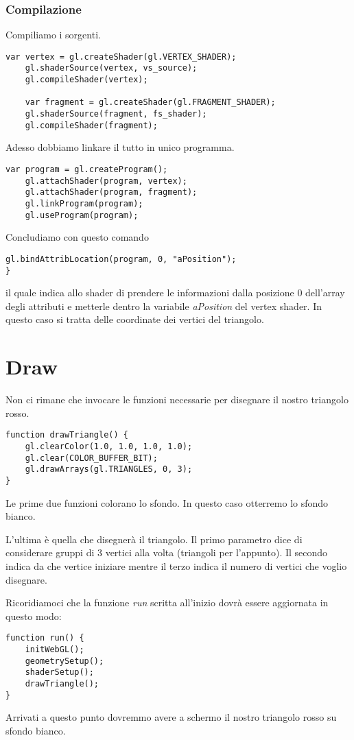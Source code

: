 \subsubsection{Compilazione}
Compiliamo i sorgenti.
\begin{lstlisting}[style=js, firstnumber=14]
	var vertex = gl.createShader(gl.VERTEX_SHADER);
	gl.shaderSource(vertex, vs_source);
	gl.compileShader(vertex);

	var fragment = gl.createShader(gl.FRAGMENT_SHADER);
	gl.shaderSource(fragment, fs_shader);
	gl.compileShader(fragment);
\end{lstlisting}
\newpage
Adesso dobbiamo linkare il tutto in unico programma.
\begin{lstlisting}[style=js, firstnumber=21]
	var program = gl.createProgram();
	gl.attachShader(program, vertex);
	gl.attachShader(program, fragment);
	gl.linkProgram(program);
	gl.useProgram(program);
\end{lstlisting}
Concludiamo con questo comando
\begin{lstlisting}[style=js, firstnumber=26]
	gl.bindAttribLocation(program, 0, "aPosition");
}
\end{lstlisting}
il quale indica allo shader di prendere le informazioni dalla posizione 0 dell'array degli
attributi e metterle dentro la variabile \emph{aPosition} del vertex shader. In questo caso
si tratta delle coordinate dei vertici del triangolo.

\section{Draw}
Non ci rimane che invocare le funzioni necessarie per disegnare il nostro triangolo rosso.
\begin{lstlisting}[style=js]
function drawTriangle() {
	gl.clearColor(1.0, 1.0, 1.0, 1.0);
	gl.clear(COLOR_BUFFER_BIT);
	gl.drawArrays(gl.TRIANGLES, 0, 3);
}
\end{lstlisting}
Le prime due funzioni colorano lo sfondo. In questo caso otterremo lo sfondo bianco.

L'ultima \`e quella che disegner\`a il triangolo. Il primo parametro dice di considerare
gruppi di 3 vertici alla volta (triangoli per l'appunto). Il secondo indica da che vertice
iniziare mentre il terzo indica il numero di vertici che voglio disegnare.

Ricoridiamoci che la funzione \emph{run} scritta all'inizio dovr\`a essere aggiornata
in questo modo:
\begin{lstlisting}[style=js]
function run() {
	initWebGL();
	geometrySetup();
	shaderSetup();
	drawTriangle();
}
\end{lstlisting}
Arrivati a questo punto dovremmo avere a schermo il nostro triangolo rosso su sfondo bianco.